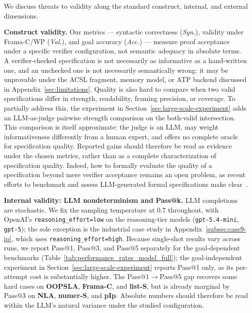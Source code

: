 We discuss threats to validity along the standard construct, internal, and
external dimensions.

\smallskip
\noindent\textbf{Construct validity.}
Our metrics --- syntactic correctness (\emph{Syn.}), validity under Frama-C/WP
(\emph{Val.}), and goal accuracy (\emph{Acc.}) --- measure proof acceptance
under a specific verifier configuration, not semantic adequacy in absolute
terms. A verifier-checked specification is not necessarily as informative as a
hand-written one, and an unchecked one is not necessarily semantically wrong: it
may be unprovable under the ACSL fragment, memory model, or ATP backend
discussed in Appendix~\ref{sec:limitations}. Quality is also hard to compare when
two valid specifications differ in strength, readability, framing precision, or
coverage. To partially address this, the experiment in
Section~\ref{sec:large-scale-experiment} adds an LLM-as-judge pairwise strength
comparison on the both-valid intersection. This comparison is itself
approximate: the judge is an LLM, may weight informativeness differently from a
human expert, and offers no complete oracle for specification quality. Reported
gains should therefore be read as evidence under the chosen metrics, rather than
as a complete characterization of specification quality. Indeed, how to
formally evaluate the quality of a specification beyond mere verifier
acceptance remains an open problem, as recent efforts to benchmark and assess
LLM-generated formal specifications make
clear~\cite{yang2026how,thakur2025clever}.

\smallskip
\noindent\textbf{Internal validity: LLM nondeterminism and Pass@k.}
LLM completions are stochastic. We fix the sampling temperature at $0.7$
throughout, with OpenAI's \texttt{reasoning\_effort=low} on the reasoning-tier
models (\texttt{gpt-5.4-mini}, \texttt{gpt-5}); the sole exception is the
industrial case study in {Appendix}~\ref{subsec:case9-ip}, which uses
\texttt{reasoning\_effort=high}.
Because single-shot results vary across runs, we report Pass@1,
Pass@3, and Pass@5 separately for the goal-dependent benchmarks
(Table~\ref{tab:performance_rates_model_full}); the goal-independent
experiment in Section~\ref{sec:large-scale-experiment} reports Pass@1 only, as its
per-attempt cost is substantially higher. The Pass@1$\to$Pass@5 gap recovers
some hard cases on \textbf{OOPSLA}, \textbf{Frama-C}, and \textbf{list-S}, but is
already marginal by Pass@3 on \textbf{NLA}, \textbf{numer-S}, and \textbf{pIp}.
Absolute numbers
should therefore be read within the LLM's natural variance under the studied
configuration.


